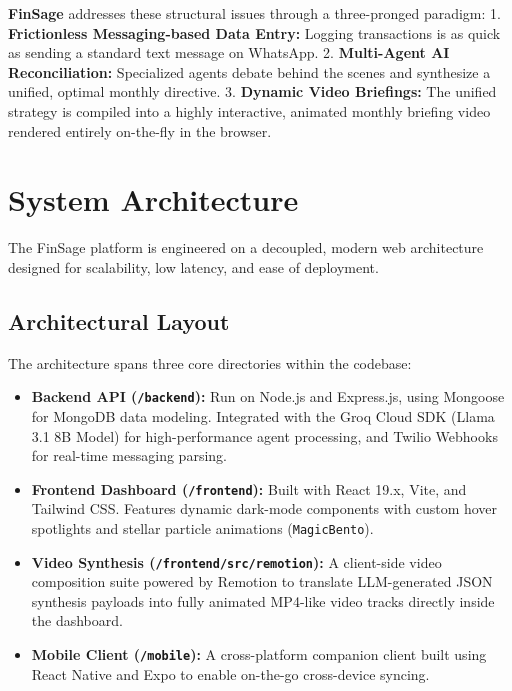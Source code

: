 \documentclass[11pt,a4paper]{article}
\begin{document}
\textbf{FinSage} addresses these structural issues through a three-pronged paradigm:
1. \textbf{Frictionless Messaging-based Data Entry:} Logging transactions is as quick as sending a standard text message on WhatsApp.
2. \textbf{Multi-Agent AI Reconciliation:} Specialized agents debate behind the scenes and synthesize a unified, optimal monthly directive.
3. \textbf{Dynamic Video Briefings:} The unified strategy is compiled into a highly interactive, animated monthly briefing video rendered entirely on-the-fly in the browser.

\section{System Architecture}
The FinSage platform is engineered on a decoupled, modern web architecture designed for scalability, low latency, and ease of deployment.

\subsection{Architectural Layout}
The architecture spans three core directories within the codebase:
\begin{itemize}
    \item \textbf{Backend API (\texttt{/backend}):} Run on Node.js and Express.js, using Mongoose for MongoDB data modeling. Integrated with the Groq Cloud SDK (Llama 3.1 8B Model) for high-performance agent processing, and Twilio Webhooks for real-time messaging parsing.
    \item \textbf{Frontend Dashboard (\texttt{/frontend}):} Built with React 19.x, Vite, and Tailwind CSS. Features dynamic dark-mode components with custom hover spotlights and stellar particle animations (\texttt{MagicBento}).
    \item \textbf{Video Synthesis (\texttt{/frontend/src/remotion}):} A client-side video composition suite powered by Remotion to translate LLM-generated JSON synthesis payloads into fully animated MP4-like video tracks directly inside the dashboard.
    \item \textbf{Mobile Client (\texttt{/mobile}):} A cross-platform companion client built using React Native and Expo to enable on-the-go cross-device syncing.
\end{itemize}
\end{document}
